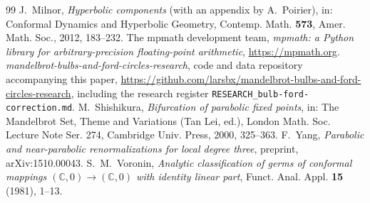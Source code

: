 \documentclass[11pt]{amsart}
\theoremstyle{definition}
\theoremstyle{remark}
\newcommand{\C}{\mathbb{C}}
\begin{document}
\begin{thebibliography}{99}
 J.~Milnor, \emph{Hyperbolic components} (with an appendix by A.~Poirier), in: Conformal Dynamics and Hyperbolic Geometry, Contemp. Math. \textbf{573}, Amer. Math. Soc., 2012, 183--232.
 The mpmath development team, \emph{mpmath: a Python library for arbitrary-precision floating-point arithmetic}, \url{https://mpmath.org}.
 \emph{mandelbrot-bulbs-and-ford-circles-research}, code and data repository accompanying this paper, \url{https://github.com/larsbx/mandelbrot-bulbs-and-ford-circles-research}, including the research register \texttt{RESEARCH\_bulb-ford-correction.md}.
 M.~Shishikura, \emph{Bifurcation of parabolic fixed points}, in: The Mandelbrot Set, Theme and Variations (Tan Lei, ed.), London Math. Soc. Lecture Note Ser. 274, Cambridge Univ. Press, 2000, 325--363.
 F.~Yang, \emph{Parabolic and near-parabolic renormalizations for local degree three}, preprint, arXiv:1510.00043.
 S.~M.~Voronin, \emph{Analytic classification of germs of conformal mappings $(\C,0)\to(\C,0)$ with identity linear part}, Funct. Anal. Appl. \textbf{15} (1981), 1--13.
\end{thebibliography}
\end{document}
